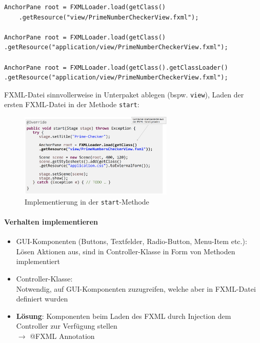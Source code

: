 \documentclass[a4paper]{article}
\begin{document}
		\begin{lstlisting}
AnchorPane root = FXMLLoader.load(getClass()
	.getResource("view/PrimeNumberCheckerView.fxml");
	
AnchorPane root = FXMLLoader.load(getClass()
.getResource("application/view/PrimeNumberCheckerView.fxml");

AnchorPane root = FXMLLoader.load(getClass().getClassLoader()
.getResource("application/view/PrimeNumberCheckerView.fxml");
		\end{lstlisting}
		\noindent
		FXML-Datei sinnvollerweise in Unterpaket ablegen (bspw. \texttt{view}), Laden der ersten FXML-Datei in der Methode \texttt{start}:
		
		\begin{figure}[!htb]
			\centering
			\includegraphics[keepaspectratio, height=4cm]{img/gui/start.png}
			\caption{Implementierung in der \texttt{start}-Methode}
			\label{fig:startimpl}
		\end{figure}
		
		\newpage
		
		\paragraph{Verhalten implementieren}
		
		\begin{itemize}
			\item GUI-Komponenten (Buttons, Textfelder, Radio-Button, Menu-Item etc.):\\
			Lösen Aktionen aus, sind in Controller-Klasse in Form von Methoden implementiert
			\item Controller-Klasse:\\
			Notwendig, auf GUI-Komponenten zuzugreifen, welche aber in FXML-Datei definiert wurden
			\item \textbf{Lösung}: Komponenten beim Laden des FXML durch Injection dem Controller zur Verfügung stellen\\
			$\rightarrow$ @FXML Annotation
		\end{itemize}
	
\end{document}
